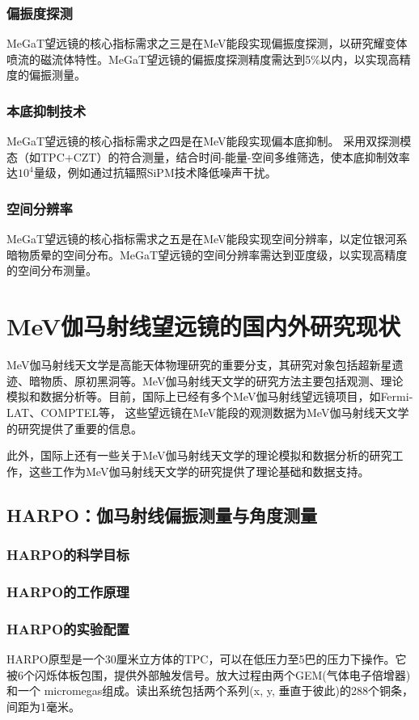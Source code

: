\subsubsection{偏振度探测}
	MeGaT望远镜的核心指标需求之三是在MeV能段实现偏振度探测，以研究耀变体喷流的磁流体特性。MeGaT望远镜的偏振度探测精度需达到5\%以内，以实现高精度的偏振测量。
\subsubsection{本底抑制技术}
	MeGaT望远镜的核心指标需求之四是在MeV能段实现偏本底抑制。
	采用双探测模态（如TPC+CZT）的符合测量，结合时间-能量-空间多维筛选，使本底抑制效率达$10^{4}$量级，例如通过抗辐照SiPM技术降低噪声干扰。
\subsubsection{空间分辨率}
	MeGaT望远镜的核心指标需求之五是在MeV能段实现空间分辨率，以定位银河系暗物质晕的空间分布。MeGaT望远镜的空间分辨率需达到亚度级，以实现高精度的空间分布测量。
	
\section{MeV伽马射线望远镜的国内外研究现状}
\label{sec:status}
MeV伽马射线天文学是高能天体物理研究的重要分支，其研究对象包括超新星遗迹、暗物质、原初黑洞等。MeV伽马射线天文学的研究方法主要包括观测、理论模拟和数据分析等。目前，国际上已经有多个MeV伽马射线望远镜项目，如Fermi-LAT、COMPTEL等，
这些望远镜在MeV能段的观测数据为MeV伽马射线天文学的研究提供了重要的信息。\par
此外，国际上还有一些关于MeV伽马射线天文学的理论模拟和数据分析的研究工作，这些工作为MeV伽马射线天文学的研究提供了理论基础和数据支持。\par
\subsection{HARPO：伽马射线偏振测量与角度测量}
\subsubsection{HARPO的科学目标}

\subsubsection{HARPO的工作原理}

\subsubsection{HARPO的实验配置}
	HARPO原型是一个30厘米立方体的TPC，可以在低压力至5巴的压力下操作。它被6个闪烁体板包围，提供外部触发信号。放大过程由两个GEM(气体电子倍增器)和一个
	micromegas组成。读出系统包括两个系列(x, y, 垂直于彼此)的288个铜条，间距为1毫米。

